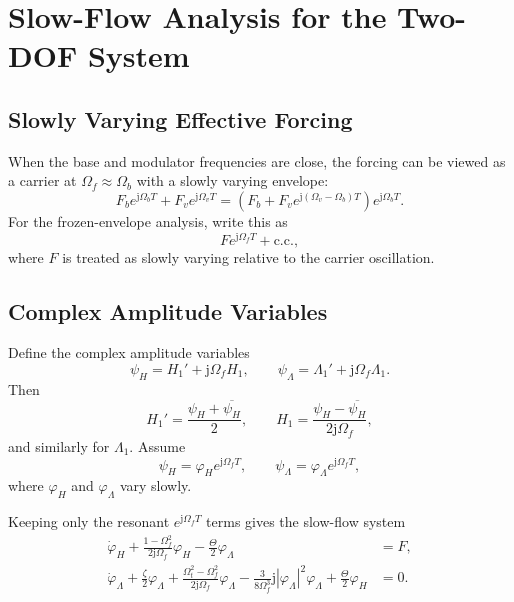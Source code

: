 \documentclass[11pt]{article}
\newcommand{\jj}{\mathrm{j}}
\newcommand{\cc}{\mathrm{c.c.}}
\begin{document}
\section{Slow-Flow Analysis for the Two-DOF System}

\subsection{Slowly Varying Effective Forcing}

When the base and modulator frequencies are close, the forcing can be viewed as
a carrier at $\Omega_f\approx \Omega_b$ with a slowly varying envelope:
\begin{equation}
  F_b e^{\jj\Omega_bT}+F_v e^{\jj\Omega_vT}
  =
  \left(F_b+F_v e^{\jj(\Omega_v-\Omega_b)T}\right)e^{\jj\Omega_bT}.
\end{equation}
For the frozen-envelope analysis, write this as
\begin{equation}
  F e^{\jj\Omega_fT}+\cc,
\end{equation}
where $F$ is treated as slowly varying relative to the carrier oscillation.

\subsection{Complex Amplitude Variables}

Define the complex amplitude variables
\begin{equation}
  \psi_H = H_1' + \jj\Omega_f H_1,\qquad
  \psi_\Lambda = \Lambda_1' + \jj\Omega_f \Lambda_1.
\end{equation}
Then
\begin{equation}
  H_1'=\frac{\psi_H+\overline{\psi_H}}{2},\qquad
  H_1=\frac{\psi_H-\overline{\psi_H}}{2\jj\Omega_f},
\end{equation}
and similarly for $\Lambda_1$.  Assume
\begin{equation}
  \psi_H=\varphi_H e^{\jj\Omega_fT},\qquad
  \psi_\Lambda=\varphi_\Lambda e^{\jj\Omega_fT},
\end{equation}
where $\varphi_H$ and $\varphi_\Lambda$ vary slowly.

Keeping only the resonant $e^{\jj\Omega_fT}$ terms gives the slow-flow system
\begin{align}
  \dot\varphi_H
  +\frac{1-\Omega_f^2}{2\jj\Omega_f}\varphi_H
  -\frac{\Theta}{2}\varphi_\Lambda
  &=F,
  \label{eq:slow_h}\\
  \dot\varphi_\Lambda
  +\frac{\zeta}{2}\varphi_\Lambda
  +\frac{\Omega_t^2-\Omega_f^2}{2\jj\Omega_f}\varphi_\Lambda
  -\frac{3}{8\Omega_f^3}\jj |\varphi_\Lambda|^2\varphi_\Lambda
  +\frac{\Theta}{2}\varphi_H
  &=0.
  \label{eq:slow_l}
\end{align}
\end{document}
